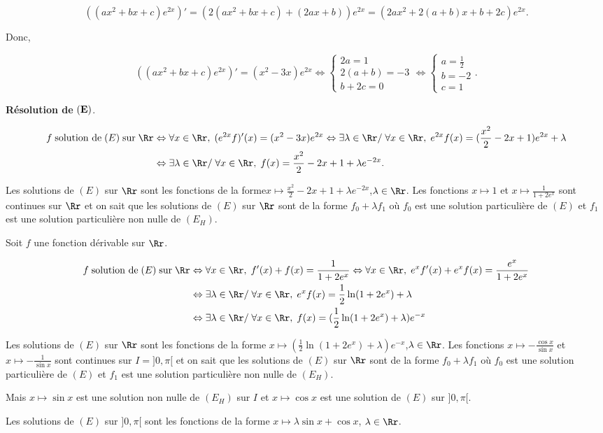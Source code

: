 {{\begin{itemize}
$$((ax^2+bx+c)e^{2x})'=(2(ax^2+bx+c)+(2ax+b))e^{2x}=(2ax^2+2(a+b)x+b+2c)e^{2x}.$$

Donc,

$$((ax^2+bx+c)e^{2x})'=(x^2-3x)e^{2x}\Leftrightarrow
\left\{
\begin{array}{l}
2a=1\\
2(a+b)=-3\\
b+2c=0
\end{array}
\right.\Leftrightarrow\left\{
\begin{array}{l}
a=\frac{1}{2}\\
b=-2\\
c=1
\end{array}
\right..$$

\end{itemize}

\textbf{Résolution de} $\bf{(E)}$.

\begin{align*}\ensuremath
f\;\mbox{solution de}\;(E)\;\mbox{sur}\;\Rr&\Leftrightarrow\forall
x\in\Rr,\;(e^{2x}f)'(x)=(x^2-3x)e^{2x}\Leftrightarrow\exists\lambda\in\Rr/\;\forall
x\in\Rr,\;e^{2x}f(x)=(\frac{x^2}{2}-2x+1)e^{2x}+\lambda\\
 &\Leftrightarrow\exists\lambda\in\Rr/\;\forall
x\in\Rr,\;f(x)=\frac{x^2}{2}-2x+1+\lambda e^{-2x}.
\end{align*}

Les solutions de $(E)$ sur  $\Rr$ sont les fonctions de la
forme$x\mapsto\frac{x^2}{2}-2x+1+\lambda e^{-2x}$,$\lambda\in\Rr$.
Les fonctions $x\mapsto1$ et $x\mapsto\frac{1}{1+2e^x}$ sont continues sur $\Rr$ et on sait
que les solutions de $(E)$ sur $\Rr$ sont de la forme
$f_0+\lambda f_1$ où $f_0$ est une solution particulière de $(E)$ et $f_1$ est une solution particulière non nulle de
$(E_H)$.

Soit $f$ une fonction dérivable sur $\Rr$.

\begin{align*}\ensuremath
f\;\mbox{solution de}\;(E)\;\mbox{sur}\;\Rr&\Leftrightarrow\forall x\in\Rr,\;f'(x)+f(x)=\frac{1}{1+2e^x}
\Leftrightarrow\forall x\in\Rr,\;e^xf'(x)+e^xf(x)=\frac{e^x}{1+2e^x}\\
 &\Leftrightarrow\exists\lambda\in\Rr/\;\forall x\in\Rr,\;e^xf(x)=\frac{1}{2}\ln(1+2e^x)+\lambda\\
 &\Leftrightarrow\exists\lambda\in\Rr/\;\forall x\in\Rr,\;f(x)=(\frac{1}{2}\ln(1+2e^x)+\lambda)e^{-x}
\end{align*}

Les solutions de $(E)$ sur  $\Rr$ sont les fonctions de la forme
$x\mapsto(\frac{1}{2}\ln(1+2e^x)+\lambda)e^{-x}$,$\lambda\in\Rr$.
Les fonctions $x\mapsto-\frac{\cos x}{\sin x}$ et $x\mapsto-\frac{1}{\sin x}$ sont continues sur $I=]0,\pi[$
et on sait que les solutions de $(E)$ sur $\Rr$ sont de la forme
$f_0+\lambda f_1$ où $f_0$ est une solution particulière de $(E)$ et $f_1$ est une solution particulière non nulle de
$(E_H)$.

Mais $x\mapsto\sin x$ est une solution non nulle de $(E_H)$ sur $I$ et $x\mapsto\cos x$ est une solution de $(E)$ sur
$]0,\pi[$.

Les solutions de $(E)$ sur  $]0,\pi[$ sont les fonctions de la forme $x\mapsto\lambda\sin x+\cos x$, $\lambda\in\Rr$.
}
}
